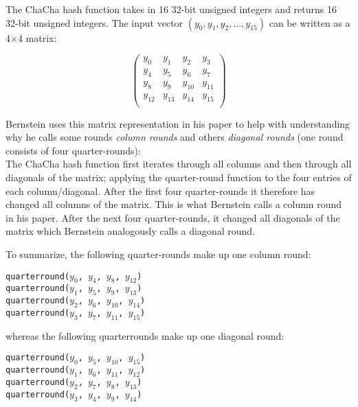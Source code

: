 The ChaCha hash function takes in 16 32-bit unsigned integers and returns 16 32-bit unsigned integers. The input vector $(y_0, y_1, y_2, \dots, y_{15})$ can be written as a 4$\times$4 matrix:

\begin{equation*}
\begin{pmatrix}
y_0 & y_1 & y_2 & y_3 \\
y_4 & y_5 & y_6 & y_7 \\
y_8 & y_9 & y_{10} & y_{11} \\
y_{12} & y_{13} & y_{14} & y_{15}\\
\end{pmatrix}
\end{equation*}

\noindent
Bernstein uses this matrix representation in his paper to help with understanding why he calls some rounds \textit{column rounds} and others \textit{diagonal rounds} (one round consists of four quarter-rounds): \\
The ChaCha hash function first iterates through all columns and then through all diagonals of the matrix; applying the quarter-round function to the four entries of each column/diagonal. After the first four quarter-rounds it therefore has changed all columns of the matrix. This is what Bernstein calls a column round in his paper. After the next four quarter-rounds, it changed all diagonals of the matrix which Bernstein analogously calls a diagonal round.

\pagebreak
\noindent
To summarize, the following quarter-rounds make up one column round:
\begin{center}
\begin{minipage}{0.5\linewidth}
\texttt{quarterround($y_0$, $y_4$, $y_8$, $y_{12}$)} \\
\texttt{quarterround($y_1$, $y_5$, $y_9$, $y_{13}$)} \\
\texttt{quarterround($y_2$, $y_6$, $y_{10}$, $y_{14}$)} \\
\texttt{quarterround($y_3$, $y_7$, $y_{11}$, $y_{15}$)} \\
\end{minipage}
\end{center}

\noindent whereas the following quarterrounds make up one diagonal round:
\begin{center}
\begin{minipage}{0.5\linewidth}
\texttt{quarterround($y_0$, $y_5$, $y_{10}$, $y_{15}$)} \\
\texttt{quarterround($y_1$, $y_6$, $y_{11}$, $y_{12}$)} \\
\texttt{quarterround($y_2$, $y_7$, $y_8$, $y_{13}$)} \\
\texttt{quarterround($y_3$, $y_4$, $y_9$, $y_{14}$)} \\
\end{minipage}
\end{center}


